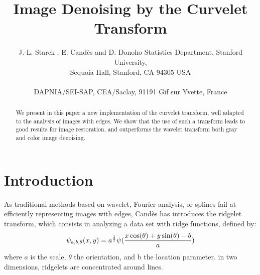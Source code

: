 \documentclass{article}
\begin{document}
\pagestyle{empty}
 

\title{Image Denoising by the Curvelet Transform}
\author{J.-L. Starck , E. Cand\`es  and D. Donoho   
\skiplinehalf 
{} Statistics Department, Stanford University, \\ 
Sequoia Hall,  Stanford, CA 94305 USA \\  
\\
 DAPNIA/SEI-SAP, CEA/Saclay, 91191 Gif sur Yvette, France 
}

 

\maketitle
 

\begin{abstract}
We present in this paper a new implementation of the curvelet transform,
well adapted to the analysis of images with edges.
We show that the use of such a transform leads to good results for 
image restoration, and outperforms the wavelet transform both gray and 
color image denoising.
\end{abstract}


\section{Introduction}

As traditional methods based on wavelet, Fourier analysis, or splines
fail at efficiently representing images with edges, 
Cand\`es \cite{cur:candes98,cur:candes99_3}
has introduces the ridgelet transform, which
consists in analyzing a data set with ridge functions, defined by:
\begin{eqnarray}
\psi_{a,b,\theta}(x,y) = a^{1 \over 2} \psi(\frac{x \cos(\theta) + y \sin(\theta)-b}{a})
\end{eqnarray}
where $a$ is the scale, $\theta$ the orientation, and b the location parameter.
in two dimensions, ridgelets are concentrated around lines.
\end{document}
